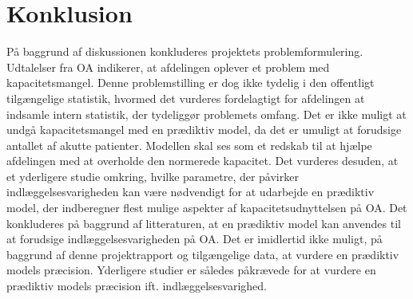 \clearpage
\section{Konklusion}
På baggrund af diskussionen konkluderes projektets problemformulering. Udtalelser fra OA indikerer, at afdelingen oplever et problem med kapacitetsmangel. Denne problemstilling er dog ikke tydelig i den offentligt tilgængelige statistik, hvormed det vurderes fordelagtigt for afdelingen at indsamle intern statistik, der tydeliggør problemets omfang. 
Det er ikke muligt at undgå kapacitetsmangel med en prædiktiv model, da det er umuligt at forudsige antallet af akutte patienter. Modellen skal ses som et redskab til at hjælpe afdelingen med at overholde den normerede kapacitet.
Det vurderes desuden, at et yderligere studie omkring, hvilke parametre, der påvirker indlæggelsesvarigheden kan være nødvendigt for at udarbejde en prædiktiv model, der indberegner flest mulige aspekter af kapacitetsudnyttelsen på OA.
Det konkluderes på baggrund af litteraturen, at en prædiktiv model kan anvendes til at forudsige indlæggelsesvarigheden på OA. Det er imidlertid ikke muligt, på baggrund af denne projektrapport og tilgængelige data, at vurdere en prædiktiv models præcision. Yderligere studier er således påkrævede for at vurdere en prædiktiv models præcision ift. indlæggelsesvarighed.